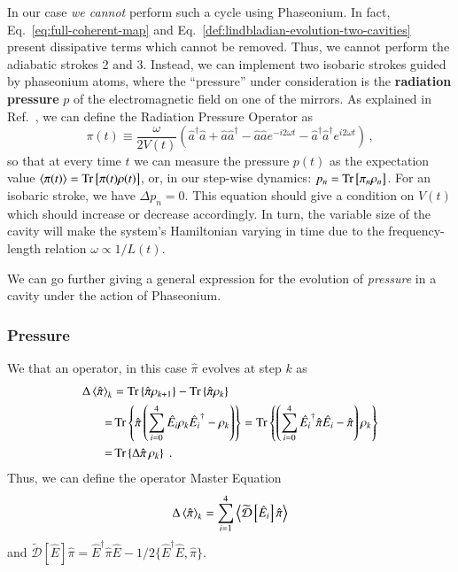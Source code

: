 \documentclass[]{article}
\renewcommand{\a}{\hat{a}}
\newcommand{\ad}{\hat{a}^\dagger}
\begin{document}
In our case \emph{we cannot} perform such a cycle using Phaseonium. 
In fact, Eq.~\ref{eq:full-coherent-map} and Eq.~\ref{def:lindbladian-evolution-two-cavities} present dissipative terms which cannot be removed.
Thus, we cannot perform the adiabatic strokes 2 and 3.
Instead, we can implement two isobaric strokes guided by phaseonium atoms, where the ``pressure'' under consideration is the \textbf{radiation pressure} $p$ of the electromagnetic field on one of the mirrors.
As explained in Ref.~\cite{tejero_atom-doped_2024}, we can define the Radiation Pressure Operator as
\begin{equation}\label{def:radiation-pressure}
    \pi(t) \equiv \frac{\omega}{2V(t)}\left( \ad\a + \a\ad - \a\a e^{-i2\omega t} - \ad\ad e^{i2\omega t} \right) \,,
\end{equation}
so that at every time $t$ we can measure the pressure $p(t)$ as the expectation value $\expval{\pi(t)}=\Tr\left[\pi(t)\rho(t)\right]$, or, in our step-wise dynamics: $p_n = \Tr\left[\pi_n\rho_n\right]$.
For an isobaric stroke, we have $\Delta p_n = 0$. This equation should give a condition on $V(t)$ which should increase or decrease accordingly. In turn, the variable size of the cavity will make the system's Hamiltonian varying in time due to the frequency-length relation $\omega \propto 1/L(t)$.

We can go further giving a general expression for the evolution of \emph{pressure} in a cavity under the action of Phaseonium.

\subsubsection{Pressure}
We that an operator, in this case $\hat{\pi}$ evolves at step $k$ as
\begin{align}
    \Delta\expval{\hat{\pi}}_k &= \Tr\left\{\hat{\pi}\rho_{k+1}\right\} - \Tr\left\{\hat{\pi}\rho_{k}\right\} \\
    =& \Tr\left\{\hat{\pi}\left(\sum_{i=0}^4\hat{E_i}\rho_k\hat{E_i}^\dagger - \rho_k\right)\right\} = \Tr\left\{\left(\sum_{i=0}^4\hat{E_i}^\dagger\hat{\pi}\hat{E_i} - \hat{\pi}\right) \rho_k\right\} \\
    =& \Tr\left\{\Delta\hat{\pi}\,\rho_{k}\right\}\;.
\end{align}
Thus, we can define the operator Master Equation
\begin{equation}
    \Delta\expval{\hat{\pi}}_k = \sum_{i=1}^4\expval{\widetilde{\mathcal{D}}\left[\hat{E}_i\right]\hat{\pi}}
\end{equation}
and $\widetilde{\mathcal{D}}[\hat E]\hat{\pi}=\hat E^\dagger\hat{\pi}\hat E-1/2\{\hat E^\dagger\hat E,\hat{\pi}\}$.
\end{document}
